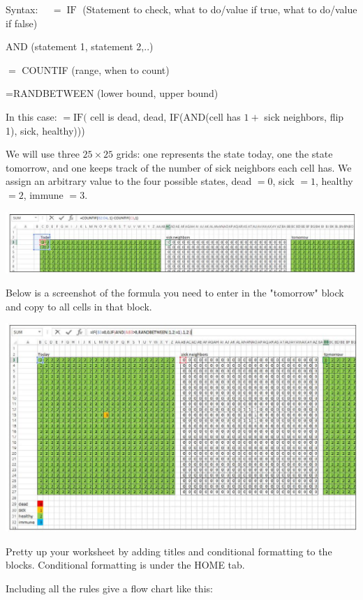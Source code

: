 \documentclass[10pt]{article}
\begin{document}
Syntax: $\quad=\operatorname{IF}$ (Statement to check, what to do/value if true, what to do/value if false)

AND (statement 1, statement 2,..)

$=$ COUNTIF (range, when to count)

=RANDBETWEEN (lower bound, upper bound)

In this case: $=\mathrm{IF}($ cell is dead, dead, IF(AND(cell has $1+$ sick neighbors, flip 1), sick, healthy)))

We will use three $25 \times 25$ grids: one represents the state today, one the state tomorrow, and one keeps track of the number of sick neighbors each cell has. We assign an arbitrary value to the four possible states, dead $=0$, sick $=1$, healthy $=2$, immune $=3$.

\includegraphics[max width=\textwidth]{2022_07_05_5945264bba2a5f6ba667g-23}

Below is a screenshot of the formula you need to enter in the "tomorrow" block and copy to all cells in that block.

\includegraphics[max width=\textwidth]{2022_07_05_5945264bba2a5f6ba667g-23(1)}

Pretty up your worksheet by adding titles and conditional formatting to the blocks. Conditional formatting is under the HOME tab.

Including all the rules give a flow chart like this:\\
\end{document}
